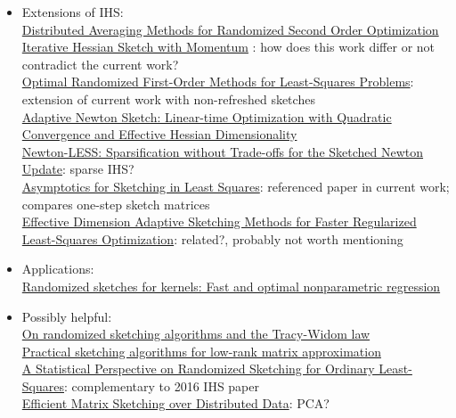 \documentclass[10pt]{article}
\begin{document}
\begin{itemize}

\item
Extensions of IHS: \\
\href{https://arxiv.org/pdf/2002.06540.pdf}{Distributed Averaging Methods for Randomized Second Order Optimization} \\
\href{https://ieeexplore.ieee.org/document/8682720}{Iterative Hessian Sketch with Momentum} \todo: how does this work differ or not contradict the current work? \\
\href{https://proceedings.mlr.press/v119/lacotte20a/lacotte20a.pdf}{Optimal Randomized First-Order Methods for Least-Squares Problems}: extension of current work with non-refreshed sketches \\
\href{https://arxiv.org/pdf/2105.07291.pdf}{Adaptive Newton Sketch: Linear-time Optimization with Quadratic Convergence and Effective Hessian Dimensionality} \\
\href{https://arxiv.org/pdf/2107.07480.pdf}{Newton-LESS: Sparsification without Trade-offs for the Sketched Newton Update}: sparse IHS? \\
\href{https://proceedings.neurips.cc/paper/2019/file/1f36c15d6a3d18d52e8d493bc8187cb9-Paper.pdf}{Asymptotics for Sketching in Least Squares}: referenced paper in current work; compares one-step sketch matrices \\
\href{https://arxiv.org/pdf/2006.05874.pdf}{Effective Dimension Adaptive Sketching Methods for Faster Regularized Least-Squares Optimization}: related?, probably not worth mentioning

\item
Applications: \\
\href{https://projecteuclid.org/journals/annals-of-statistics/volume-45/issue-3/Randomized-sketches-for-kernels-Fast-and-optimal-nonparametric-regression/10.1214/16-AOS1472.full}{Randomized sketches for kernels: Fast and optimal nonparametric regression}

\item
Possibly helpful: \\
\href{https://arxiv.org/pdf/2201.00450.pdf}{On randomized sketching algorithms and the Tracy-Widom law} \\
\href{https://arxiv.org/pdf/1609.00048.pdf}{Practical sketching algorithms for low-rank matrix approximation} \\
\href{https://www.jmlr.org/papers/volume17/15-440/15-440.pdf}{A Statistical Perspective on Randomized Sketching for Ordinary Least-Squares}: complementary to 2016 IHS paper \\
\href{https://dl.acm.org/doi/10.1145/3034786.3056119}{Efficient Matrix Sketching over Distributed Data}: PCA?

\end{itemize}



\newpage



\end{document}
